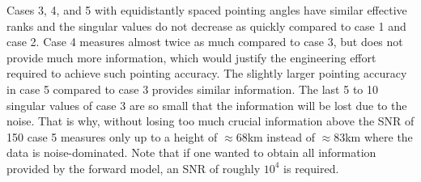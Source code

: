 Cases 3, 4, and 5 with equidistantly spaced pointing angles have similar effective ranks and the singular values do not decrease as quickly compared to case 1 and case 2.
Case 4 measures almost twice as much compared to case 3, but does not provide much more information, which would justify the engineering effort required to achieve such pointing accuracy.
The slightly larger pointing accuracy in case 5 compared to case 3 provides similar information.
The last 5 to 10 singular values of case 3 are so small that the information will be lost due to the noise.
That is why, without losing too much crucial information above the SNR of 150 case 5 measures only up to a height of $\approx 68$km instead of $\approx83$km where the data is noise-dominated.
Note that if one wanted to obtain all information provided by the forward model, an SNR of roughly $10^4$ is required.
% 
